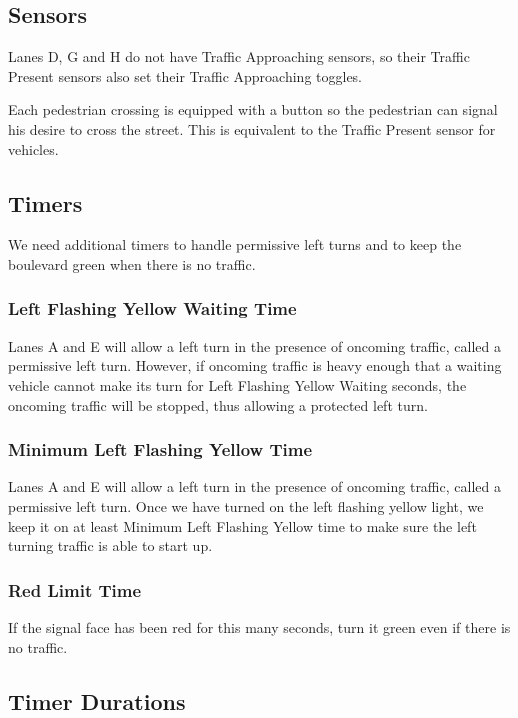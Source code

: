 \documentclass[letterpaper,twoside]{article}
\begin{document}
\subsection{Sensors}

Lanes D, G and H do not have Traffic Approaching sensors, so their
Traffic Present sensors also set their Traffic Approaching toggles.

Each pedestrian crossing is equipped with a button so the pedestrian can
signal his desire to cross the street.  This is equivalent to the
Traffic Present sensor for vehicles.

\subsection{Timers}

We need additional timers to handle permissive left turns and to
keep the boulevard green when there is no traffic.

\subsubsection{Left Flashing Yellow Waiting Time}

Lanes A and E will allow a left turn in the presence of oncoming traffic,
called a permissive left turn. However, if oncoming traffic is heavy enough
that a waiting vehicle cannot make its turn for Left Flashing Yellow Waiting
seconds, the oncoming traffic will be stopped, thus allowing a protected left
turn.

\subsubsection{Minimum Left Flashing Yellow Time}

Lanes A and E will allow a left turn in the presence of oncoming traffic,
called a permissive left turn. Once we have turned on the left flashing
yellow light, we keep it on at least Minimum Left Flashing Yellow time
to make sure the left turning traffic is able to start up.

\subsubsection{Red Limit Time}
If the signal face has been red for this many seconds, turn it green
even if there is no traffic.

\subsection{Timer Durations}
\end{document}
